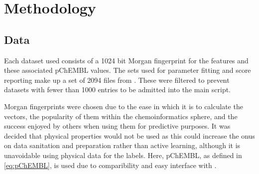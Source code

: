 \chapter{Methodology}
\label{ch:method}

\graphicspath{{Chapter3/Figs/Vector/}{Chapter3/Figs/}}

\section{Data}
Each dataset used consists of a 1024 bit Morgan fingerprint for the features and these associated pChEMBL values. The sets used for parameter fitting and score reporting make up a set of 2094 files from \textcite{CHEMBL}. These were filtered to prevent datasets with fewer than 1000 entries to be admitted into the main script.

Morgan fingerprints were chosen due to the ease in which it is to calculate the vectors, the popularity of them within the chemoinformatics sphere, and the success enjoyed by others when using them for predictive purposes. It was decided that physical properties would not be used as this could increase the onus on data sanitation and preparation rather than active learning, although it is unavoidable using physical data for the labels. Here, pChEMBL, as defined in \ref{eq:pChEMBL}, is used due to comparibility and easy interface with \textcite{CHEMBL}.

